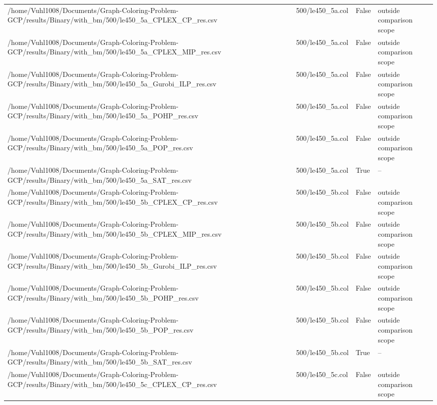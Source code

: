\begin{table}[htbp]
\begin{tabular}{llll}
/home/Vuhl1008/Documents/Graph-Coloring-Problem-GCP/results/Binary/with\_bm/500/le450\_5a\_CPLEX\_CP\_res.csv & 500/le450\_5a.col & False & outside comparison scope \\
/home/Vuhl1008/Documents/Graph-Coloring-Problem-GCP/results/Binary/with\_bm/500/le450\_5a\_CPLEX\_MIP\_res.csv & 500/le450\_5a.col & False & outside comparison scope \\
/home/Vuhl1008/Documents/Graph-Coloring-Problem-GCP/results/Binary/with\_bm/500/le450\_5a\_Gurobi\_ILP\_res.csv & 500/le450\_5a.col & False & outside comparison scope \\
/home/Vuhl1008/Documents/Graph-Coloring-Problem-GCP/results/Binary/with\_bm/500/le450\_5a\_POHP\_res.csv & 500/le450\_5a.col & False & outside comparison scope \\
/home/Vuhl1008/Documents/Graph-Coloring-Problem-GCP/results/Binary/with\_bm/500/le450\_5a\_POP\_res.csv & 500/le450\_5a.col & False & outside comparison scope \\
/home/Vuhl1008/Documents/Graph-Coloring-Problem-GCP/results/Binary/with\_bm/500/le450\_5a\_SAT\_res.csv & 500/le450\_5a.col & True & -- \\
/home/Vuhl1008/Documents/Graph-Coloring-Problem-GCP/results/Binary/with\_bm/500/le450\_5b\_CPLEX\_CP\_res.csv & 500/le450\_5b.col & False & outside comparison scope \\
/home/Vuhl1008/Documents/Graph-Coloring-Problem-GCP/results/Binary/with\_bm/500/le450\_5b\_CPLEX\_MIP\_res.csv & 500/le450\_5b.col & False & outside comparison scope \\
/home/Vuhl1008/Documents/Graph-Coloring-Problem-GCP/results/Binary/with\_bm/500/le450\_5b\_Gurobi\_ILP\_res.csv & 500/le450\_5b.col & False & outside comparison scope \\
/home/Vuhl1008/Documents/Graph-Coloring-Problem-GCP/results/Binary/with\_bm/500/le450\_5b\_POHP\_res.csv & 500/le450\_5b.col & False & outside comparison scope \\
/home/Vuhl1008/Documents/Graph-Coloring-Problem-GCP/results/Binary/with\_bm/500/le450\_5b\_POP\_res.csv & 500/le450\_5b.col & False & outside comparison scope \\
/home/Vuhl1008/Documents/Graph-Coloring-Problem-GCP/results/Binary/with\_bm/500/le450\_5b\_SAT\_res.csv & 500/le450\_5b.col & True & -- \\
/home/Vuhl1008/Documents/Graph-Coloring-Problem-GCP/results/Binary/with\_bm/500/le450\_5c\_CPLEX\_CP\_res.csv & 500/le450\_5c.col & False & outside comparison scope \\

\end{tabular}
\end{table}

